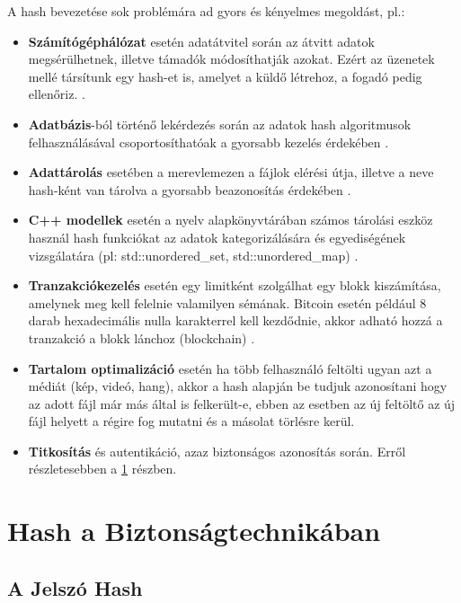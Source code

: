 \noindent A hash bevezetése sok problémára ad gyors és kényelmes megoldást, pl.:
%
\begin{itemize}
  \item \textbf{Számítógéphálózat} esetén adatátvitel során az átvitt adatok megsérülhetnek, illetve támadók módosíthatják azokat. Ezért az üzenetek mellé társítunk egy hash-et is, amelyet a küldő létrehoz, a fogadó pedig ellenőriz. \cite{chen2017approach}.
  \item \textbf{Adatbázis}-ból történő lekérdezés során az adatok hash algoritmusok felhasználásával csoportosíthatóak a gyorsabb kezelés érdekében \cite{dungan2010classifying}.
  \item \textbf{Adattárolás} esetében a merevlemezen a fájlok elérési útja, illetve a neve hash-ként van tárolva a gyorsabb beazonosítás érdekében \cite{garfinkel2010using}.
  \item \textbf{C++ modellek} esetén a nyelv alapkönyvtárában számos tárolási eszköz használ hash funkciókat az adatok kategorizálására és egyediségének vizsgálatára (pl: std::unordered\_set, std::unordered\_map) \cite{guntheroth2016optimized}.
  \item \textbf{Tranzakciókezelés} esetén egy limitként szolgálhat egy blokk kiszámítása, amelynek meg kell felelnie valamilyen sémának. Bitcoin esetén például 8 darab hexadecimális nulla karakterrel kell kezdődnie, akkor adható hozzá a tranzakció a blokk lánchoz (blockchain) \cite{courtois2014optimizing}.
  \item \textbf{Tartalom optimalizáció} esetén ha több felhasználó feltölti ugyan azt a médiát (kép, videó, hang), akkor a hash alapján be tudjuk azonosítani hogy az adott fájl már más által is felkerült-e, ebben az esetben az új feltöltő az új fájl helyett a régire fog mutatni és a másolat törlésre kerül.
  \item \textbf{Titkosítás} és autentikáció, azaz biztonságos azonosítás során. Erről részletesebben a \ref{sec:hash_security} részben. 
\end{itemize}



\section{Hash a Biztonságtechnikában}
\label{sec:hash_security}

\subsection{A Jelszó Hash}


